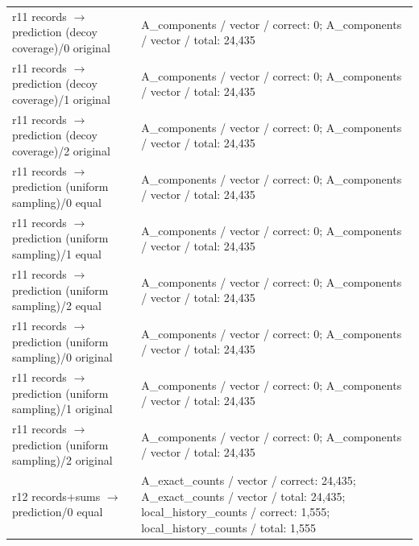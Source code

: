 \begin{longtable}{@{}>{\raggedright\arraybackslash}p{1.800in}>{\raggedright\arraybackslash}p{4.200in}@{}}
r11 records $\to$ prediction (decoy coverage)/\allowbreak{}0 original & A\_\allowbreak{}components /\allowbreak{} vector /\allowbreak{} correct: 0; A\_\allowbreak{}components /\allowbreak{} vector /\allowbreak{} total: 24,435 \\
r11 records $\to$ prediction (decoy coverage)/\allowbreak{}1 original & A\_\allowbreak{}components /\allowbreak{} vector /\allowbreak{} correct: 0; A\_\allowbreak{}components /\allowbreak{} vector /\allowbreak{} total: 24,435 \\
r11 records $\to$ prediction (decoy coverage)/\allowbreak{}2 original & A\_\allowbreak{}components /\allowbreak{} vector /\allowbreak{} correct: 0; A\_\allowbreak{}components /\allowbreak{} vector /\allowbreak{} total: 24,435 \\
r11 records $\to$ prediction (uniform sampling)/\allowbreak{}0 equal & A\_\allowbreak{}components /\allowbreak{} vector /\allowbreak{} correct: 0; A\_\allowbreak{}components /\allowbreak{} vector /\allowbreak{} total: 24,435 \\
r11 records $\to$ prediction (uniform sampling)/\allowbreak{}1 equal & A\_\allowbreak{}components /\allowbreak{} vector /\allowbreak{} correct: 0; A\_\allowbreak{}components /\allowbreak{} vector /\allowbreak{} total: 24,435 \\
r11 records $\to$ prediction (uniform sampling)/\allowbreak{}2 equal & A\_\allowbreak{}components /\allowbreak{} vector /\allowbreak{} correct: 0; A\_\allowbreak{}components /\allowbreak{} vector /\allowbreak{} total: 24,435 \\
r11 records $\to$ prediction (uniform sampling)/\allowbreak{}0 original & A\_\allowbreak{}components /\allowbreak{} vector /\allowbreak{} correct: 0; A\_\allowbreak{}components /\allowbreak{} vector /\allowbreak{} total: 24,435 \\
r11 records $\to$ prediction (uniform sampling)/\allowbreak{}1 original & A\_\allowbreak{}components /\allowbreak{} vector /\allowbreak{} correct: 0; A\_\allowbreak{}components /\allowbreak{} vector /\allowbreak{} total: 24,435 \\
r11 records $\to$ prediction (uniform sampling)/\allowbreak{}2 original & A\_\allowbreak{}components /\allowbreak{} vector /\allowbreak{} correct: 0; A\_\allowbreak{}components /\allowbreak{} vector /\allowbreak{} total: 24,435 \\
r12 records+sums $\to$ prediction/\allowbreak{}0 equal & A\_\allowbreak{}exact\_\allowbreak{}counts /\allowbreak{} vector /\allowbreak{} correct: 24,435; A\_\allowbreak{}exact\_\allowbreak{}counts /\allowbreak{} vector /\allowbreak{} total: 24,435; local\_\allowbreak{}history\_\allowbreak{}counts /\allowbreak{} correct: 1,555; local\_\allowbreak{}history\_\allowbreak{}counts /\allowbreak{} total: 1,555 \\

\end{longtable}
